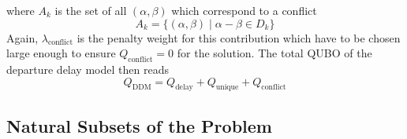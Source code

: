 \documentclass[aps,pra,twocolumn,10pt]{revtex4-1}
\begin{document}
where $A_k$ is the set of all $(\alpha, \beta)$ which correspond to a conflict
\begin{equation*}
    A_k = \{(\alpha, \beta) \; | \; \alpha - \beta \in D_k\}
\end{equation*}
Again, $\lambda_\text{conflict}$ is the penalty weight for this contribution which have to be chosen large enough to ensure $Q_\text{conflict}=0$ for the solution.
The total QUBO of the departure delay model then reads
\begin{equation*}
    Q_\text{DDM} = Q_\text{delay} + Q_\text{unique} + Q_\text{conflict}
\end{equation*}

\subsection{Natural Subsets of the Problem}
\end{document}
